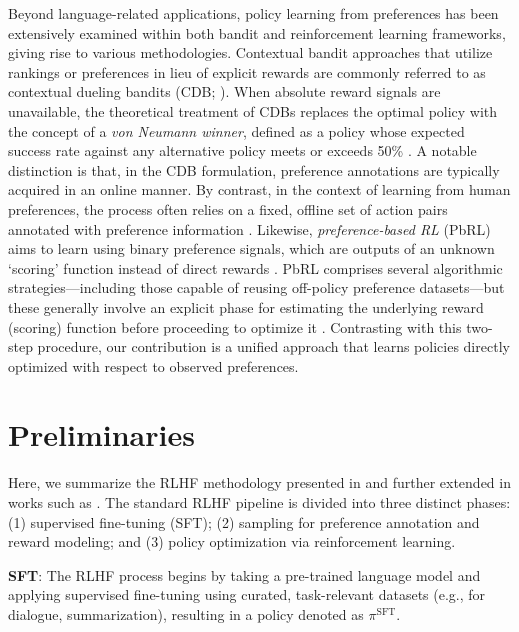Beyond language-related applications, policy learning from preferences has been extensively examined within both bandit and reinforcement learning frameworks, giving rise to various methodologies. Contextual bandit approaches that utilize rankings or preferences in lieu of explicit rewards are commonly referred to as contextual dueling bandits (CDB; \cite{yue2012karmed,dudik2015contextual}). When absolute reward signals are unavailable, the theoretical treatment of CDBs replaces the optimal policy with the concept of a \textit{von Neumann winner}, defined as a policy whose expected success rate against any alternative policy meets or exceeds 50\% \citep{dudik2015contextual}. A notable distinction is that, in the CDB formulation, preference annotations are typically acquired in an online manner. By contrast, in the context of learning from human preferences, the process often relies on a fixed, offline set of action pairs annotated with preference information \citep{yan2022human}. Likewise, \textit{preference-based RL} (PbRL) aims to learn using binary preference signals, which are outputs of an unknown ‘scoring’ function instead of direct rewards \citep{BusaFekete2014,ruiz2023dueling}. PbRL comprises several algorithmic strategies—including those capable of reusing off-policy preference datasets—but these generally involve an explicit phase for estimating the underlying reward (scoring) function before proceeding to optimize it \citep{jain2013learning,BusaFekete2014,christiano2017deep,sadigh2017active,kupcsik2018learning}. Contrasting with this two-step procedure, our contribution is a unified approach that learns policies directly optimized with respect to observed preferences.

\section{Preliminaries}\label{section:prelims}

Here, we summarize the RLHF methodology presented in \citeauthor{ziegler2020finetuning} and further extended in works such as \citep{stiennon2022learning, bai2022training, ouyang2022training}. The standard RLHF pipeline is divided into three distinct phases: (1) supervised fine-tuning (SFT); (2) sampling for preference annotation and reward modeling; and (3) policy optimization via reinforcement learning.

\textbf{SFT}: The RLHF process begins by taking a pre-trained language model and applying supervised fine-tuning using curated, task-relevant datasets (e.g., for dialogue, summarization), resulting in a policy denoted as $\pi^\text{SFT}$. 

